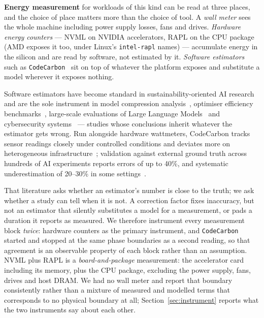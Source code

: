 \textbf{Energy measurement} for workloads of this kind can be read at three
places, and the choice of place matters more than the choice of tool.
A \emph{wall meter} sees the whole machine including power supply losses, fans
and drives. \emph{Hardware energy counters} --- NVML on NVIDIA accelerators,
RAPL on the CPU package (AMD exposes it too, under Linux's \texttt{intel-rapl}
names) --- accumulate energy in the silicon and are read by software, not
estimated by it.
\emph{Software estimators} such as \texttt{CodeCarbon}~\citep{codecarbon} sit on
top of whatever the platform exposes and substitute a model wherever it exposes
nothing.

Software estimators have become standard in sustainability-oriented AI
research~\citep{dodge2022efficient,patterson2022plateau} and are the sole
instrument in model compression analysis~\citep{paula2025comparative},
optimiser efficiency benchmarks~\citep{almog2025optimizer}, large-scale
evaluations of Large Language Models~\citep{luccioni2024power} and cybersecurity
systems~\citep{cybergreen2026} --- studies whose conclusions inherit whatever the
estimator gets wrong. Run alongside hardware wattmeters, CodeCarbon tracks
sensor readings closely under controlled conditions and deviates more on
heterogeneous infrastructure~\citep{aquino2025energyindex,bouza2023carbonfootprint};
validation against external ground truth across hundreds of AI experiments
reports errors of up to 40\%, and systematic underestimation of 20--30\% in some
settings~\citep{fischer2026groundtruthing}.

That literature asks whether an estimator's number is close to the truth; we
ask whether a study can tell when it is not. A correction factor fixes
inaccuracy, but not an estimator that silently substitutes a model for a
measurement, or pads a duration it reports as measured. We therefore instrument every measurement block
\emph{twice}: hardware counters as the primary instrument, and
\texttt{CodeCarbon} started and stopped at the same phase boundaries as a
second reading, so that agreement is an observable property of each block
rather than an assumption. NVML plus
RAPL is a \emph{board-and-package} measurement: the accelerator card including
its memory, plus the CPU package, excluding the power supply, fans, drives and
host DRAM. We had no wall meter and report that boundary consistently rather
than a mixture of measured and modelled terms that corresponds to no physical
boundary at all; Section~\ref{sec:instrument} reports what the two instruments
say about each other.


